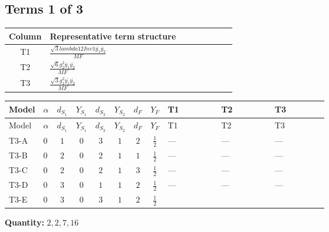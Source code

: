 \documentclass[8pt]{article}
\begin{document}
\begin{landscape}
\subsection*{Terms 1 of 3}
\begin{center}
\begin{tabular}{@{}c >{\raggedright\arraybackslash}p{0.82\linewidth}@{}}
\toprule
Column & Representative term structure \\
\midrule
T1 & \(\displaystyle \frac{\sqrt{3} lambda12Inv1 \overline{y_{1}} \overline{y_{2}}}{MF}\) \\
\midrule
T2 & \(\displaystyle \frac{\sqrt{6} g_{2}^{2} \overline{y_{1}} \overline{y_{2}}}{MF}\) \\
\midrule
T3 & \(\displaystyle \frac{\sqrt{3} g_{1}^{2} \overline{y_{1}} \overline{y_{2}}}{MF}\) \\
\midrule
\bottomrule
\end{tabular}
\end{center}
\smallskip
\tiny
\begin{longtable}{@{}llcccccc >{\raggedright\arraybackslash}p{0.21\linewidth} >{\raggedright\arraybackslash}p{0.21\linewidth} >{\raggedright\arraybackslash}p{0.21\linewidth}@{}}
\toprule
Model & $\alpha$ & $d_{S_1}$ & $Y_{S_1}$ & $d_{S_2}$ & $Y_{S_2}$ & $d_F$ & $Y_F$ & T1 & T2 & T3 \\
\midrule
\endfirsthead
\toprule
Model & $\alpha$ & $d_{S_1}$ & $Y_{S_1}$ & $d_{S_2}$ & $Y_{S_2}$ & $d_F$ & $Y_F$ & T1 & T2 & T3 \\
\midrule
\endhead
T3-A & $0$ & $1$ & $0$ & $3$ & $1$ & $2$ & $\frac{1}{2}$ & --- & --- & --- \\
\midrule
T3-B & $0$ & $2$ & $0$ & $2$ & $1$ & $1$ & $\frac{1}{2}$ & --- & --- & --- \\
\midrule
T3-C & $0$ & $2$ & $0$ & $2$ & $1$ & $3$ & $\frac{1}{2}$ & --- & --- & --- \\
\midrule
T3-D & $0$ & $3$ & $0$ & $1$ & $1$ & $2$ & $\frac{1}{2}$ & --- & --- & --- \\
\midrule
T3-E & $0$ & $3$ & $0$ & $3$ & $1$ & $2$ & $\frac{1}{2}$ & \scriptsize\adjustbox{max width=\linewidth}{$\begin{gathered} - \frac{\sqrt{3} lambda12Inv1 \overline{y_{1}} \overline{y_{2}}}{6 MF}\end{gathered}$} & \scriptsize\adjustbox{max width=\linewidth}{$\begin{gathered} \frac{\sqrt{6} g_{2}^{2} \overline{y_{1}} \overline{y_{2}}}{3 MF}\end{gathered}$} & \scriptsize\adjustbox{max width=\linewidth}{$\begin{gathered} \frac{\sqrt{3} g_{1}^{2} \overline{y_{1}} \overline{y_{2}}}{8 MF}\end{gathered}$} \\
\midrule
\bottomrule
\end{longtable}
\clearpage
\noindent\textbf{Quantity: }$\mathrm{2,2,7,16}$\par\smallskip

\end{landscape}
\end{document}
